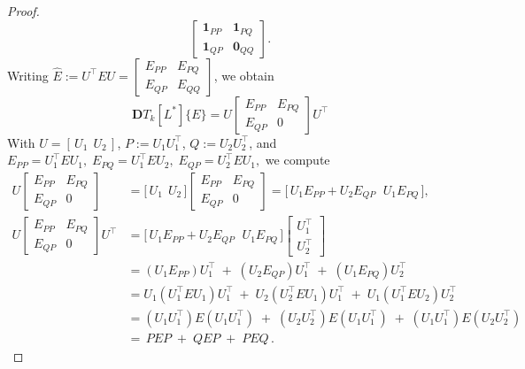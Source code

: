 \documentclass[final,hidelinks,onefignum,onetabnum]{siamart250211}
\providecommand{\1}{\mathbf{1}}
\theoremstyle{plain}
\begin{document}
\begin{proof}
\[\begin{bmatrix}
\mathbf{1}_{PP} & \mathbf{1}_{PQ}\\[2pt]
\mathbf{1}_{QP} & \mathbf{0}_{QQ}
\end{bmatrix}.
\]
Writing \(\widehat E:=U^\top E U=\begin{bmatrix}E_{PP}&E_{PQ}\\[2pt]E_{QP}&E_{QQ}\end{bmatrix}\), we obtain
\[
\mathbf{D}T_k[L^*]\{E\}
=U\!\begin{bmatrix}E_{PP}&E_{PQ}\\[2pt]E_{QP}&0\end{bmatrix}\!U^\top
\]
With \(U=[\,U_1\ \ U_2\,]\), \(P:=U_1U_1^\top\), \(Q:=U_2U_2^\top\), and
\(
E_{PP}=U_1^\top E U_1,\;
E_{PQ}=U_1^\top E U_2,\;
E_{QP}=U_2^\top E U_1,
\)
we compute
\[
\begin{aligned}
U\!\begin{bmatrix}E_{PP}&E_{PQ}\\[2pt]E_{QP}&0\end{bmatrix}
&=\big[\,U_1\ \ U_2\,\big]
   \begin{bmatrix}E_{PP}&E_{PQ}\\[2pt]E_{QP}&0\end{bmatrix}
 =\big[\,U_1E_{PP}+U_2E_{QP}\ \ \, U_1E_{PQ}\,\big],\\[4pt]
U\!\begin{bmatrix}E_{PP}&E_{PQ}\\[2pt]E_{QP}&0\end{bmatrix}\!U^\top
&=\big[\,U_1E_{PP}+U_2E_{QP}\ \ \, U_1E_{PQ}\,\big]
   \begin{bmatrix}U_1^\top\\[2pt]U_2^\top\end{bmatrix}\\[4pt]
&=(U_1E_{PP})U_1^\top \;+\; (U_2E_{QP})U_1^\top \;+\; (U_1E_{PQ})U_2^\top\\[2pt]
&=U_1(U_1^\top E U_1)U_1^\top \;+\; U_2(U_2^\top E U_1)U_1^\top \;+\; U_1(U_1^\top E U_2)U_2^\top\\[2pt]
&=(U_1U_1^\top)E(U_1U_1^\top) \;+\; (U_2U_2^\top)E(U_1U_1^\top) \;+\; (U_1U_1^\top)E(U_2U_2^\top)\\[2pt]
&=\,PEP \;+\; QEP \;+\; PEQ\,.
\end{aligned}
\]



\end{proof}
\end{document}
